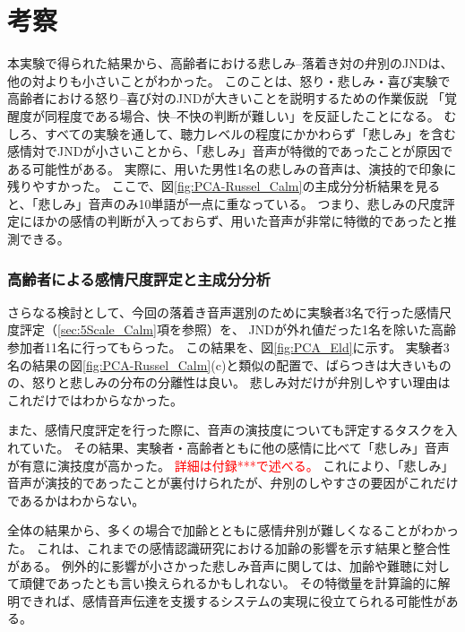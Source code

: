 \section{考察}
本実験で得られた結果から、高齢者における悲しみ--落着き対の弁別のJNDは、他の対よりも小さいことがわかった。
このことは、怒り・悲しみ・喜び実験で高齢者における怒り--喜び対のJNDが大きいことを説明するための作業仮説
「覚醒度が同程度である場合、快--不快の判断が難しい」を反証したことになる。
むしろ、すべての実験を通して、聴力レベルの程度にかかわらず「悲しみ」を含む感情対でJNDが小さいことから、「悲しみ」音声が特徴的であったことが原因である可能性がある。
実際に、用いた男性1名の悲しみの音声は、演技的で印象に残りやすかった。
ここで、図\ref{fig:PCA-Russel_Calm}の主成分分析結果を見ると、「悲しみ」音声のみ10単語が一点に重なっている。
つまり、悲しみの尺度評定にほかの感情の判断が入っておらず、用いた音声が非常に特徴的であったと推測できる。

\subsubsection{高齢者による感情尺度評定と主成分分析}
さらなる検討として、今回の落着き音声選別のために実験者3名で行った感情尺度評定（\ref{sec:5Scale_Calm}項を参照）を、
JNDが外れ値だった1名を除いた高齢参加者11名に行ってもらった。
この結果を、図\ref{fig:PCA_Eld}に示す。
実験者3名の結果の図\ref{fig:PCA-Russel_Calm}(c)と類似の配置で、ばらつきは大きいものの、怒りと悲しみの分布の分離性は良い。
悲しみ対だけが弁別しやすい理由はこれだけではわからなかった。

また、感情尺度評定を行った際に、音声の演技度についても評定するタスクを入れていた。
その結果、実験者・高齢者ともに他の感情に比べて「悲しみ」音声が有意に演技度が高かった。
\textcolor{red}{詳細は付録***で述べる。}
これにより、「悲しみ」音声が演技的であったことが裏付けられたが、弁別のしやすさの要因がこれだけであるかはわからない。

全体の結果から、多くの場合で加齢とともに感情弁別が難しくなることがわかった。
これは、これまでの感情認識研究における加齢の影響を示す結果と整合性がある。
例外的に影響が小さかった悲しみ音声に関しては、加齢や難聴に対して頑健であったとも言い換えられるかもしれない。
その特徴量を計算論的に解明できれば、感情音声伝達を支援するシステムの実現に役立てられる可能性がある。


